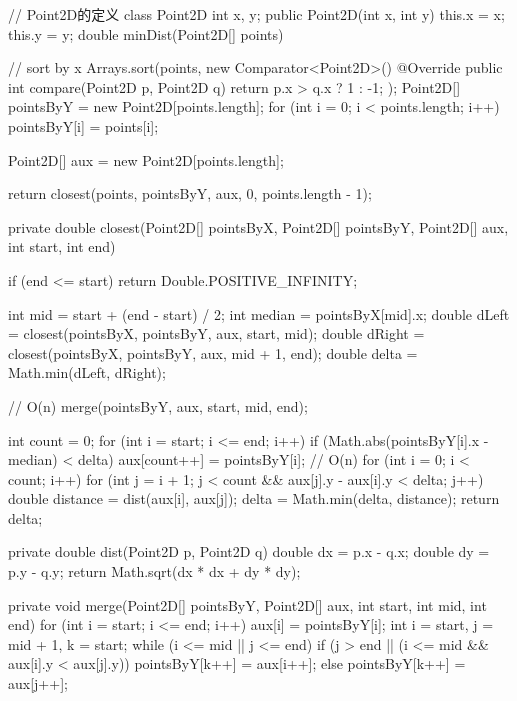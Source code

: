 \begin{Codex}[label={[$O(nlgn)+O(n)$]Chap02_11_ClosestPairOfPoints.java}]
// Point2D的定义
class Point2D {
    int x, y;
    public Point2D(int x, int y) {
        this.x = x;
        this.y = y;
    }
}
double minDist(Point2D[] points) {
	// sort by x
    Arrays.sort(points, new Comparator<Point2D>() {
        @Override
        public int compare(Point2D p, Point2D q) {
            return p.x > q.x ? 1 : -1;
        }
    });
    Point2D[] pointsByY = new Point2D[points.length];
    for (int i = 0; i < points.length; i++) {
        pointsByY[i] = points[i];
    }
	
    Point2D[] aux = new Point2D[points.length];
	
    return closest(points, pointsByY, aux, 0, points.length - 1);
}

private double closest(Point2D[] pointsByX, Point2D[] pointsByY, Point2D[] aux, int start, int end) {
    if (end <= start) {
        return Double.POSITIVE_INFINITY;
    }
	
    int mid = start + (end - start) / 2;
    int median = pointsByX[mid].x;
    double dLeft = closest(pointsByX, pointsByY, aux, start, mid);
    double dRight = closest(pointsByX, pointsByY, aux, mid + 1, end);
    double delta = Math.min(dLeft, dRight);
	
    // O(n)
    merge(pointsByY, aux, start, mid, end);
	
    int count = 0;
    for (int i = start; i <= end; i++) {
        if (Math.abs(pointsByY[i].x - median) < delta) {
            aux[count++] = pointsByY[i];
        }
    }
    // O(n)
    for (int i = 0; i < count; i++) {
        for (int j = i + 1; j < count && aux[j].y - aux[i].y < delta; j++) {
            double distance = dist(aux[i], aux[j]);
            delta = Math.min(delta, distance);
        }
    }
    return delta;
}

private double dist(Point2D p, Point2D q) {
    double dx = p.x - q.x;
    double dy = p.y - q.y;
    return Math.sqrt(dx * dx + dy * dy);
}

private void merge(Point2D[] pointsByY, Point2D[] aux, int start, int mid, int end) {
    for (int i = start; i <= end; i++) {
	    aux[i] = pointsByY[i];
    }
    int i = start, j = mid + 1, k = start;
    while (i <= mid || j <= end) {
        if (j > end || (i <= mid && aux[i].y < aux[j].y)) {
            pointsByY[k++] = aux[i++];
        } else {
            pointsByY[k++] = aux[j++];
        }
    }
}
\end{Codex}

